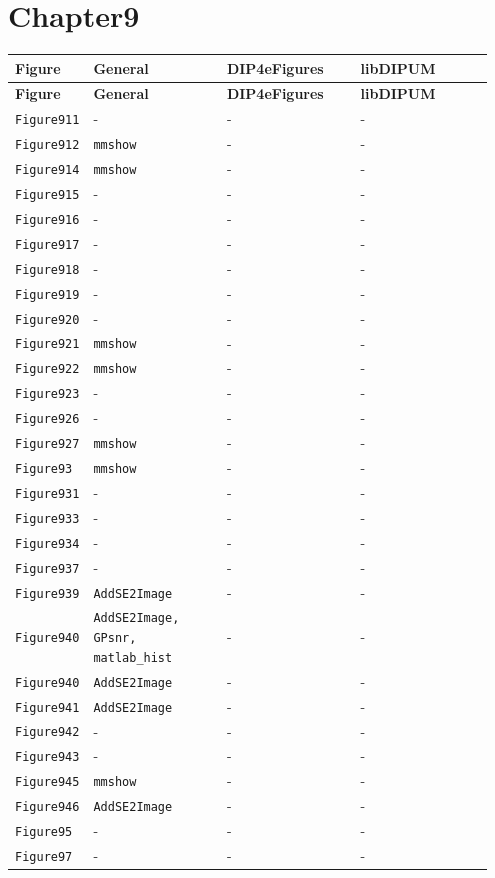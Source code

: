\documentclass[10pt]{article}
\begin{document}
\section*{Chapter9}
\setlength{\tabcolsep}{4pt}
\begin{longtable}{p{0.11\linewidth} p{0.28\linewidth} p{0.28\linewidth} p{0.28\linewidth}}
\toprule
\textbf{Figure} & \textbf{General} & \textbf{DIP4eFigures} & \textbf{libDIPUM} \\
\midrule
\endfirsthead
\toprule
\textbf{Figure} & \textbf{General} & \textbf{DIP4eFigures} & \textbf{libDIPUM} \\
\midrule
\endhead
\bottomrule
\endfoot
\texttt{Figure911} & - & - & - \\
\texttt{Figure912} & \texttt{mmshow} & - & - \\
\texttt{Figure914} & \texttt{mmshow} & - & - \\
\texttt{Figure915} & - & - & - \\
\texttt{Figure916} & - & - & - \\
\texttt{Figure917} & - & - & - \\
\texttt{Figure918} & - & - & - \\
\texttt{Figure919} & - & - & - \\
\texttt{Figure920} & - & - & - \\
\texttt{Figure921} & \texttt{mmshow} & - & - \\
\texttt{Figure922} & \texttt{mmshow} & - & - \\
\texttt{Figure923} & - & - & - \\
\texttt{Figure926} & - & - & - \\
\texttt{Figure927} & \texttt{mmshow} & - & - \\
\texttt{Figure93} & \texttt{mmshow} & - & - \\
\texttt{Figure931} & - & - & - \\
\texttt{Figure933} & - & - & - \\
\texttt{Figure934} & - & - & - \\
\texttt{Figure937} & - & - & - \\
\texttt{Figure939} & \texttt{AddSE2Image} & - & - \\
\texttt{Figure940} & \texttt{AddSE2Image, GPsnr, matlab\_hist} & - & - \\
\texttt{Figure940} & \texttt{AddSE2Image} & - & - \\
\texttt{Figure941} & \texttt{AddSE2Image} & - & - \\
\texttt{Figure942} & - & - & - \\
\texttt{Figure943} & - & - & - \\
\texttt{Figure945} & \texttt{mmshow} & - & - \\
\texttt{Figure946} & \texttt{AddSE2Image} & - & - \\
\texttt{Figure95} & - & - & - \\
\texttt{Figure97} & - & - & - \\
\end{longtable}
\end{document}
